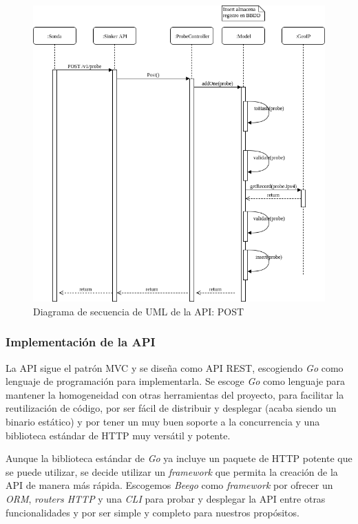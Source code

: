 \begin{figure}[htp]
    \centering
      \includegraphics[scale=0.6]{images/UMLSequencePostProbe}
    \caption{Diagrama de secuencia de UML de la API: POST}
    \label{fig:uml-sequence-post-probe}
\end{figure}

\subsubsection{Implementación de la API}
\label{subsubsec:sinkers-registry-api-implementacion}

La API sigue el patrón MVC y se diseña como API REST, escogiendo \emph{Go} como lenguaje de programación para implementarla. Se escoge \emph{Go} 
como lenguaje para mantener la homogeneidad con otras herramientas del proyecto, para facilitar la reutilización de código,
por ser fácil de distribuir y desplegar (acaba siendo un binario estático) y por tener un muy buen soporte a la concurrencia y una biblioteca
estándar de HTTP muy versátil y potente.

Aunque la biblioteca estándar de \emph{Go} ya incluye un paquete de HTTP potente que se puede utilizar, se decide utilizar un \emph{framework} 
que permita la creación de la API de manera más rápida. Escogemos \emph{Beego} como \emph{framework} por ofrecer un \emph{ORM},
\emph{routers HTTP} y una \emph{CLI} para probar y desplegar la API entre otras funcionalidades y por ser simple y completo para nuestros
propósitos.

